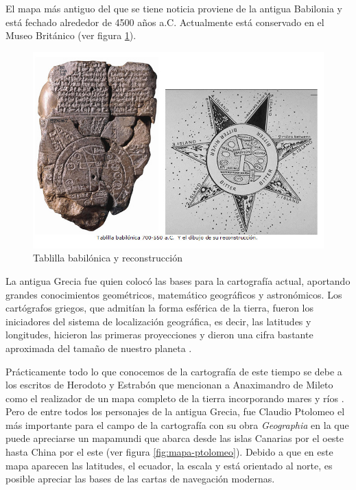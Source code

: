 El mapa más antiguo del que se tiene noticia proviene de la antigua Babilonia y está fechado alrededor de 4500 años a.C. Actualmente está conservado en el Museo Británico (ver figura \ref{fig:mapa-babilonio}).

\begin{figure}[h!btp]
\centering
\includegraphics[scale=0.5, fbox={\fboxrule} 0mm]{images/03-antecedentes/32-mapa_babilonio.jpg}
\caption{Tablilla babilónica y reconstrucción}
\label{fig:mapa-babilonio}
\end{figure}

La antigua Grecia fue quien colocó las bases para la cartografía actual, aportando grandes conocimientos geométricos, matemático geográficos y  astronómicos. Los cartógrafos griegos, que admitían la forma esférica de la tierra, fueron los iniciadores del sistema de localización geográfica, es decir, las latitudes y longitudes, hicieron las primeras proyecciones \cite{Schl07} y dieron una cifra bastante aproximada del tamaño de nuestro planeta \cite{Aup09}.

Prácticamente todo lo que conocemos de la cartografía de este tiempo se debe a los escritos de Herodoto y Estrabón que mencionan a Anaximandro de Mileto como el realizador de un mapa completo de la tierra incorporando mares y ríos \cite{Kap10}. Pero de entre todos los personajes de la antigua Grecia, fue Claudio Ptolomeo el más importante para el campo de la cartografía con su obra \textit{Geographia} en la que puede apreciarse un mapamundi que abarca desde las islas Canarias por el oeste hasta China por el este (ver figura \ref{fig:mapa-ptolomeo}). Debido a que en este mapa aparecen las latitudes, el ecuador, la escala y está orientado al norte, es posible apreciar las bases de las cartas de navegación modernas.

